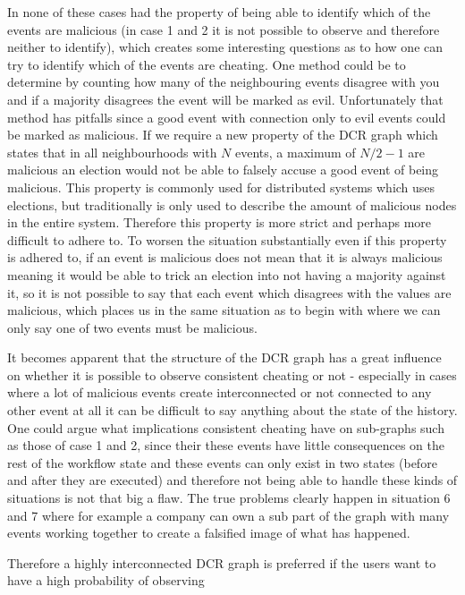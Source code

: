 	\newpar In none of these cases had the property of being able to identify which of the events are malicious (in case 1 and 2 it is not possible to observe and therefore neither to identify), which creates some interesting questions as to how one can try to identify which of the events are cheating. One method could be to determine by counting how many of the neighbouring events disagree with you and if a majority disagrees the event will be marked as evil. Unfortunately that method has pitfalls since a good event with connection only to evil events could be marked as malicious. If we require a new property of the DCR graph which states that in all neighbourhoods with $N$ events, a maximum of $N/2-1$ are malicious an election would not be able to falsely accuse a good event of being malicious. This property is commonly used for distributed systems which uses elections, but traditionally is only used to describe the amount of malicious nodes in the entire system. Therefore this property is more strict and perhaps more difficult to adhere to. To worsen the situation substantially even if this property is adhered to, if an event is malicious does not mean that it is always malicious meaning it would be able to trick an election into not having a majority against it, so it is not possible to say that each event which disagrees with the values are malicious, which places us in the same situation as to begin with where we can only say one of two events must be malicious.
	
	\newpar It becomes apparent that the structure of the DCR graph has a great influence on whether it is possible to observe consistent cheating or not - especially in cases where a lot of malicious events create interconnected or not connected to any other event at all it can be difficult to say anything about the state of the history. One could argue what implications consistent cheating have on sub-graphs such as those of case 1 and 2, since their these events have little consequences on the rest of the workflow state and these events can only exist in two states (before and after they are executed) and therefore not being able to handle these kinds of situations is not that big a flaw. The true problems clearly happen in situation 6 and 7 where for example a company can own a sub part of the graph with many events working together to create a falsified image of what has happened. 
	
	\newpar Therefore a highly interconnected DCR graph is preferred if the users want to have a high probability of observing 

